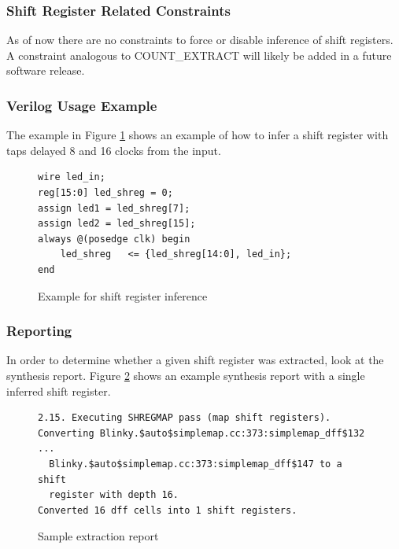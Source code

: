 \documentclass{article}
\begin{document}
\subsubsection{Shift Register Related Constraints}

As of now there are no constraints to force or disable inference of shift registers. A constraint analogous to 
COUNT\_EXTRACT will likely be added in a future software release.

\clearpage
\subsubsection{Verilog Usage Example}

The example in Figure \ref{gp-shreginfer-example} shows an example of how to infer a shift register with taps delayed 8 
and 16 clocks from the input.

\begin{figure}[h]
\begin{lstlisting}
wire led_in;
reg[15:0] led_shreg = 0;
assign led1 = led_shreg[7];
assign led2 = led_shreg[15];
always @(posedge clk) begin
	led_shreg	<= {led_shreg[14:0], led_in};
end
\end{lstlisting}
\caption{Example for shift register inference}
\label{gp-shreginfer-example}
\end{figure}

\subsubsection{Reporting}

In order to determine whether a given shift register was extracted, look at the synthesis report. Figure 
\ref{shreg-extraction} shows an example synthesis report with a single inferred shift register.

\begin{figure}[h]
{\small
\begin{verbatim}
2.15. Executing SHREGMAP pass (map shift registers).
Converting Blinky.$auto$simplemap.cc:373:simplemap_dff$132 ...
  Blinky.$auto$simplemap.cc:373:simplemap_dff$147 to a shift
  register with depth 16.
Converted 16 dff cells into 1 shift registers.
\end{verbatim}
}
\caption{Sample extraction report}
\label{shreg-extraction}
\end{figure}

\end{document}
